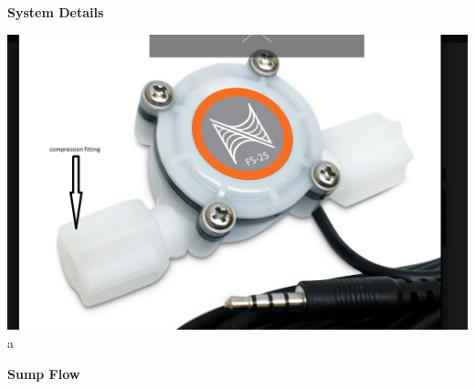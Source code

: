 \documentclass[]{book}
\begin{document}
 \textbf{System Details}

\includegraphics{images/flowmeter.PNG} a

 \textbf{Sump Flow}
\end{document}
